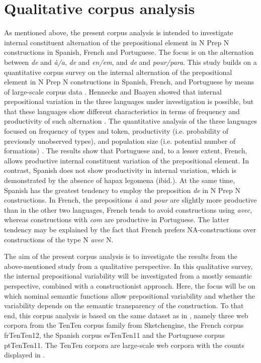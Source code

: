 \documentclass[output=paper]{langsci/langscibook}
\begin{document}
\section{Qualitative corpus analysis}
 As mentioned above, the present corpus analysis is intended to investigate internal constituent alternation of the prepositional element in N Prep N constructions in Spanish, French and Portuguese. The focus is on the alternation between \textit{de} and \textit{à/a}, \textit{de} and \textit{en/em}, and \textit{de} and \textit{pour/para}. This study builds on a quantitative corpus survey on the internal alternation of the prepositional element in N Prep N constructions in Spanish, French, and Portuguese by means of large-scale corpus data \citep{Hennecke:2017}. Hennecke and Baayen showed that internal prepositional variation in the three languages under investigation is possible, but that these languages show different characteristics in terms of frequency and productivity of such alternation \citep[144]{Hennecke:2017}. The quantitative analysis of the three languages focused on frequency of types and token, productivity (i.e. probability of previously unobserved types), and population size (i.e. potential number of formations) \citep[139]{Hennecke:2017}. The results show that Portuguese and, to a lesser extent, French, allows productive internal constituent variation of the prepositional element. In contrast, Spanish does not show productivity in internal variation, which is demonstrated by the absence of hapax legomena (ibid.). At the same time, Spanish has the greatest tendency to employ the preposition \textit{de} in N Prep N constructions. In French, the prepositions \textit{à} and \textit{pour} are slightly more productive than in the other two languages, French tends to avoid constructions using \textit{avec}, whereas constructions with \textit{com} are productive in Portuguese. The latter tendency may be explained by the fact that French prefers NA-constructions over constructions of the type N \textit{avec} N.
 
The aim of the present corpus analysis is to investigate the results from the above-mentioned study from a qualitative perspective. In this qualitative survey, the internal prepositional variability will be investigated from a mostly semantic perspective, combined with a constructionist approach. Here, the focus will be on which nominal semantic functions allow prepositional variability and whether the variability depends on the semantic transparency of the construction. To that end, this corpus analysis is based on the same dataset as in \citet{Hennecke:2017}, namely three web corpora from the TenTen corpus family from Sketchengine, the French corpus frTenTen12, the Spanish corpus esTenTen11 and the Portuguese corpus ptTenTen11. The TenTen corpora are large-scale web corpora with the counts displayed in .
\end{document}
